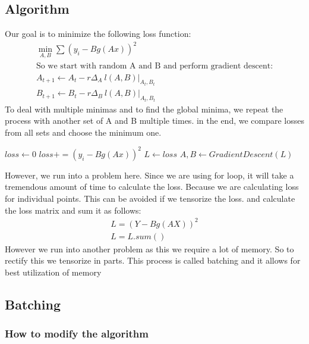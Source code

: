 \documentclass[12pt]{article}
\begin{document}
\subsection{Algorithm}
Our goal is to minimize the following loss function:
\begin{gather*}
    \min_{A,B} \sum (y_i - Bg(Ax))^2\\
\text{So we start with random A and B and perform gradient descent:}\\
A_{t+1} \leftarrow A_t - r \Delta_A \ l(A,B) \rvert_{A_t,B_t} \\
B_{t+1} \leftarrow B_t - r \Delta_B \ l(A,B) \rvert_{A_t,B_t}
\end{gather*}
To deal with multiple minimas and to find the global minima, we repeat the process with another set of A and B multiple times. in the end, we compare losses from all sets and choose the minimum one.
\begin{samepage}
\begin{algorithmic}
\State $loss \gets 0$
\State $loss += (y_i - Bg(Ax))^2$
\State $L \gets loss$
\State $A,B \gets Gradient Descent (L)$
\EndFor
\EndFor
\end{algorithmic}
\end{samepage}
However, we run into a problem here. Since we are using for loop, it will take a tremendous amount of time to calculate the loss. Because we are calculating loss for individual points.
This can be avoided if we tensorize the loss. and calculate the loss matrix and sum it as follows:
\begin{gather*}
    L = (Y - Bg(AX))^2 \\
    L = L.sum()
\end{gather*}
However we run into another problem as this we require a lot of memory. So to rectify this we tensorize in parts. This process is called batching and it allows for best utilization of memory
\subsection{Batching}

\subsubsection{How to modify the algorithm}
\end{document}
